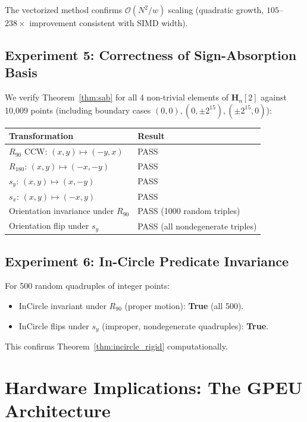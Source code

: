 \documentclass[11pt,letterpaper]{article}
\newcommand{\Hn}{\mathbf{H}_n}
\newcommand{\cO}{\mathcal{O}}
\newcommand{\wt}{w}       %
\begin{document}
The vectorized method confirms $\cO(N^2/\wt)$ scaling (quadratic growth, $105$--$238\times$
improvement consistent with SIMD width).

\subsection{Experiment 5: Correctness of Sign-Absorption Basis}

We verify Theorem~\ref{thm:sab} for all 4 non-trivial elements of $\Hn[2]$ against 10,009
points (including boundary cases $(0,0),(0,\pm2^{15}),(\pm2^{15},0)$):

\begin{center}
\begin{tabular}{ll}
\toprule
Transformation & Result \\
\midrule
$R_{90}$ CCW: $(x,y)\mapsto(-y,x)$ & PASS \\
$R_{180}$: $(x,y)\mapsto(-x,-y)$ & PASS \\
$s_y$: $(x,y)\mapsto(x,-y)$ & PASS \\
$s_x$: $(x,y)\mapsto(-x,y)$ & PASS \\
Orientation invariance under $R_{90}$ & PASS (1000 random triples) \\
Orientation flip under $s_y$ & PASS (all nondegenerate triples) \\
\bottomrule
\end{tabular}
\end{center}

\subsection{Experiment 6: In-Circle Predicate Invariance}

For 500 random quadruples of integer points:
\begin{itemize}[nosep]
\item InCircle invariant under $R_{90}$ (proper motion): \textbf{True} (all 500).
\item InCircle flips under $s_y$ (improper, nondegenerate quadruples): \textbf{True}.
\end{itemize}
This confirms Theorem~\ref{thm:incircle_rigid} computationally.

\section{Hardware Implications: The GPEU Architecture}\label{sec:hardware}
\end{document}
